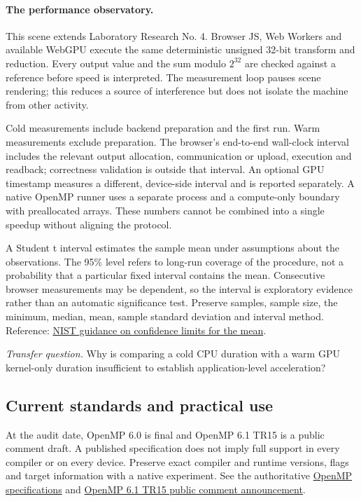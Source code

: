 {  \paragraph{The performance observatory.}
  \par This scene extends Laboratory Research No. 4. Browser JS, Web Workers and available WebGPU execute the same deterministic unsigned 32-bit transform and reduction. Every output value and the sum modulo $2^{32}$ are checked against a reference before speed is interpreted. The measurement loop pauses scene rendering; this reduces a source of interference but does not isolate the machine from other activity.
  \par Cold measurements include backend preparation and the first run. Warm measurements exclude preparation. The browser's end-to-end wall-clock interval includes the relevant output allocation, communication or upload, execution and readback; correctness validation is outside that interval. An optional GPU timestamp measures a different, device-side interval and is reported separately. A native OpenMP runner uses a separate process and a compute-only boundary with preallocated arrays. These numbers cannot be combined into a single speedup without aligning the protocol.
  \par A Student t interval estimates the sample mean under assumptions about the observations. The 95\% level refers to long-run coverage of the procedure, not a probability that a particular fixed interval contains the mean. Consecutive browser measurements may be dependent, so the interval is exploratory evidence rather than an automatic significance test. Preserve samples, sample size, the minimum, median, mean, sample standard deviation and interval method. Reference: \href{https://www.itl.nist.gov/div898/handbook/eda/section3/eda352.htm}{NIST guidance on confidence limits for the mean}.
  \par\textit{Transfer question.} Why is comparing a cold CPU duration with a warm GPU kernel-only duration insufficient to establish application-level acceleration?

  \subsection{Current standards and practical use}

  \par At the audit date, OpenMP 6.0 is final and OpenMP 6.1 TR15 is a public comment draft. A published specification does not imply full support in every compiler or on every device. Preserve exact compiler and runtime versions, flags and target information with a native experiment. See the authoritative \href{https://www.openmp.org/specifications/}{OpenMP specifications} and \href{https://www.openmp.org/home-news/public-comment-draft-6-1/}{OpenMP 6.1 TR15 public comment announcement}.

}
